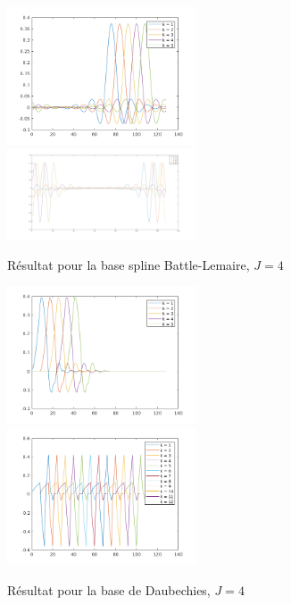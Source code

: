 \documentclass[a4paper,12pt, openany]{book}
\theoremstyle{break}
\begin{document}
\begin{figure}[H]
  \includegraphics[width=0.5\textwidth]{BattleMultipleScaleFather}\hfill
  \includegraphics[width=0.5\textwidth]{BattleMultipleScale}
  \caption{Résultat pour la base spline Battle-Lemaire, $J=4$}
  \label{fig:spline_family}
\end{figure}

\begin{figure}[H]
  \includegraphics[width=0.5\textwidth]{DaubechiesMultipleScaleFather}\hfill
  \includegraphics[width=0.5\textwidth]{DaubechiesMultipleScale}
  \caption{Résultat pour la base de Daubechies, $J=4$}
  \label{fig:deb_family}
\end{figure}
\end{document}
